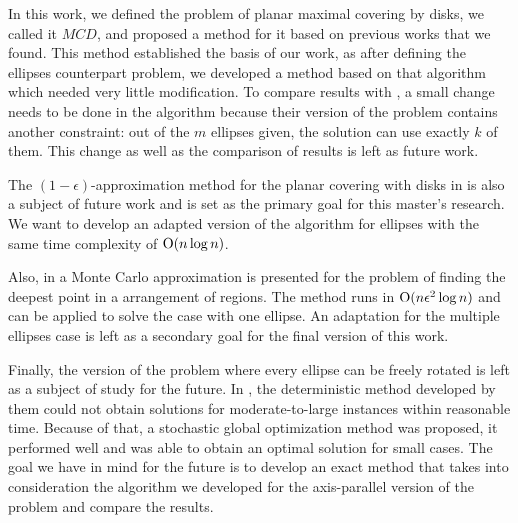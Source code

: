 In this work, we defined the problem of planar maximal covering by disks, we called it $MCD$, and proposed a method for it based on previous works that we found. This method established the basis of our work, as after defining the ellipses counterpart problem, we developed a method based on that algorithm which needed very little modification. To compare results with \cite{andreta}, a small change needs to be done in the algorithm because their version of the problem contains another constraint: out of the $m$ ellipses given, the solution can use exactly $k$ of them. This change as well as the comparison of results is left as future work.

The $(1-\epsilon)$-approximation method for the planar covering with disks in \cite{cabello:2006} is also a subject of future work and is set as the primary goal for this master's research. We want to develop an adapted version of the algorithm for ellipses with the same time complexity of $\mathrm{O}(n\log{n})$.

Also, in \cite{aronov:2008} a Monte Carlo approximation is presented for the problem of finding the deepest point in a arrangement of regions. The method runs in $\mathrm{O}(n\epsilon^2\log{n})$ and can be applied to solve the case with one ellipse. An adaptation for the multiple ellipses case is left as a secondary goal for the final version of this work.

Finally, the version of the problem where every ellipse can be freely rotated is left as a subject of study for the future. In \cite{andreta}, the deterministic method developed by them could not obtain solutions for moderate-to-large instances within reasonable time. Because of that, a stochastic global optimization method was proposed, it performed well and was able to obtain an optimal solution for small cases. The goal we have in mind for the future is to develop an exact method that takes into consideration the algorithm we developed for the axis-parallel version of the problem and compare the results.